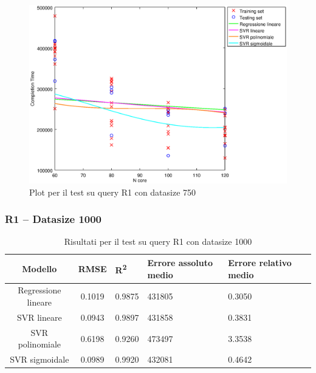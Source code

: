 \documentclass[a4paper,11pt]{article}
\begin{document}
\begin {figure}[hbtp]
\centering
\includegraphics[width=\textwidth]{output/R1_750/plot_R1_750.eps}
\caption {Plot per il test su query R1 con datasize 750}
\end {figure}

\newpage
\newpage
\subsubsection{R1 -- Datasize 1000}
\begin{table}[bhpt]
	\centering
	\begin{adjustbox}{center}
		\begin{tabular}{c | c M{1cm} M{2.5cm} M{2.5cm} M{1.8cm}}
			Modello & RMSE & R\textsuperscript{2} & Errore assoluto medio & Errore relativo medio \tabularnewline
			\hline
			Regressione lineare & 0.1019 & 0.9875 & 431805 & 0.3050 \\
			SVR lineare & 0.0943 & 0.9897 & 431858 & 0.3831 \\
			SVR polinomiale & 0.6198 & 0.9260 & 473497 & 3.3538 \\
			SVR sigmoidale & 0.0989 & 0.9920 & 432081 & 0.4642 \\
		\end{tabular}
	\end{adjustbox}
	\\
	\caption{Risultati per il test su query R1 con datasize 1000}
	\label{table_R1_1000}
\end{table}
\end{document}
